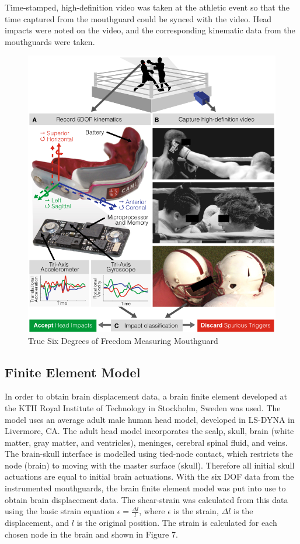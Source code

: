 \documentclass[%
 aip,
 amsmath,amssymb,
 reprint,%
 floatfix,%
]{revtex4-1}
\begin{document}
Time-stamped, high-definition video was taken at the athletic event so that the time captured from the mouthguard could be synced with the video. Head impacts were noted on the video, and the corresponding kinematic data from the mouthguards were taken.

\begin{figure}
	\centering
	\includegraphics[scale=0.2]{mouthguard.png}
	\caption{True Six Degrees of Freedom Measuring Mouthguard}
\end{figure}

\subsection{Finite Element Model}

In order to obtain brain displacement data, a brain finite element developed at the KTH Royal Institute of Technology in Stockholm, Sweden\cite{Kleiven2005} was used. The model uses an average adult male human head model, developed in LS-DYNA in Livermore, CA. The adult head model incorporates the scalp, skull, brain (white matter, gray matter, and ventricles), meninges, cerebral spinal fluid, and veins. The brain-skull interface is modelled using tied-node contact, which restricts the node (brain) to moving with the master surface (skull). Therefore all initial skull actuations are equal to initial brain actuations. With the six DOF data from the instrumented mouthguards, the brain finite element model was put into use to obtain brain displacement data. The shear-strain was calculated from this data using the basic strain equation $\epsilon = \frac{\Delta l}{l}$, where $\epsilon$ is the strain, $\Delta l$ is the displacement, and $l$ is the original position. The strain is calculated for each chosen node in the brain and shown in Figure 7.
\end{document}
